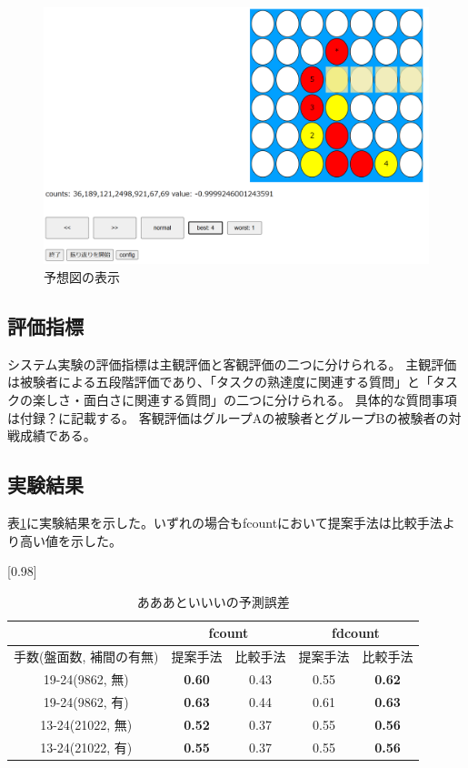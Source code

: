 \begin{figure}[t]
	\centering
	\includegraphics[width=\linewidth]{./figure/trajSystem.png}
	\caption{予想図の表示}
	\label{fig:trajSystem}
\end{figure}
\subsection{評価指標}
システム実験の評価指標は主観評価と客観評価の二つに分けられる。
主観評価は被験者による五段階評価であり、「タスクの熟達度に関連する質問」と「タスクの楽しさ・面白さに関連する質問」の二つに分けられる。
具体的な質問事項は付録？に記載する。
客観評価はグループAの被験者とグループBの被験者の対戦成績である。

\subsection{実験結果}
表\ref{table:result-online}に実験結果を示した。いずれの場合もfcountにおいて提案手法は比較手法より高い値を示した。
\begin{table}[H]
	\caption{あああといいいの予測誤差}
	\centering
	\scalebox{0.98}[0.98]{
		\begin{tabular}{c|c|c|c|c}
			\multicolumn{1}{c}{} & \multicolumn{2}{|c|}{fcount} 
			& \multicolumn{2}{c|}{fdcount}\\ \hline \hline
			手数(盤面数, 補間の有無)    & 提案手法 & 比較手法 & 提案手法 & 比較手法 \\ \hline
			19-24(9862, 無)    & \bf{0.60} & 0.43 & 0.55 & \bf{0.62} \\
			19-24(9862, 有)    & \bf{0.63} & 0.44 & 0.61 & \bf{0.63}  \\
			13-24(21022, 無)   & \bf{0.52} & 0.37 & 0.55 & \bf{0.56}  \\
			13-24(21022, 有)   & \bf{0.55} & 0.37 & 0.55 & \bf{0.56}  \\
		\end{tabular}
	}
	\label{table:result-online}
\end{table}


